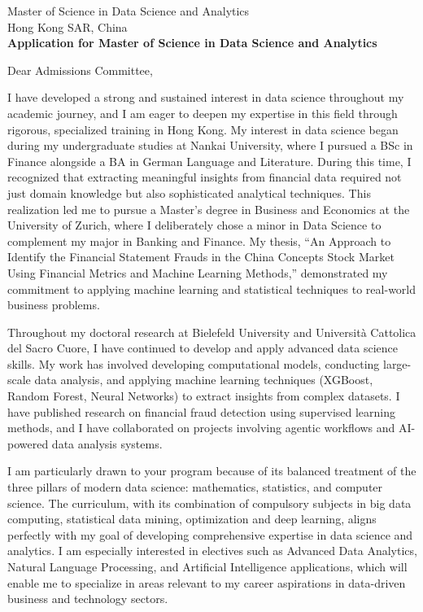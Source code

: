 \documentclass[11pt]{article}
\begin{document}

\noindent
Master of Science in Data Science and Analytics \\
Hong Kong SAR, China \\


\noindent
\textbf{Application for Master of Science in Data Science and Analytics}

\vspace{0.1cm}

\noindent Dear Admissions Committee,

I have developed a strong and sustained interest in data science throughout my academic journey, and I am eager to deepen my expertise in this field through rigorous, specialized training in Hong Kong.
My interest in data science began during my undergraduate studies at Nankai University, where I pursued a BSc in Finance alongside a BA in German Language and Literature. During this time, I recognized that extracting meaningful insights from financial data required not just domain knowledge but also sophisticated analytical techniques. This realization led me to pursue a Master's degree in Business and Economics at the University of Zurich, where I deliberately chose a minor in Data Science to complement my major in Banking and Finance. My thesis, ``An Approach to Identify the Financial Statement Frauds in the China Concepts Stock Market Using Financial Metrics and Machine Learning Methods,'' demonstrated my commitment to applying machine learning and statistical techniques to real-world business problems.

Throughout my doctoral research at Bielefeld University and Università Cattolica del Sacro Cuore, I have continued to develop and apply advanced data science skills. My work has involved developing computational models, conducting large-scale data analysis, and applying machine learning techniques (XGBoost, Random Forest, Neural Networks) to extract insights from complex datasets. I have published research on financial fraud detection using supervised learning methods, and I have collaborated on projects involving agentic workflows and AI-powered data analysis systems. 

I am particularly drawn to your program because of its balanced treatment of the three pillars of modern data science: mathematics, statistics, and computer science. The curriculum, with its combination of compulsory subjects in big data computing, statistical data mining, optimization and deep learning, aligns perfectly with my goal of developing comprehensive expertise in data science and analytics. 
I am especially interested in electives such as Advanced Data Analytics, Natural Language Processing, and Artificial Intelligence applications, 
which will enable me to specialize in areas relevant to my career aspirations in data-driven business and technology sectors.
\end{document}
